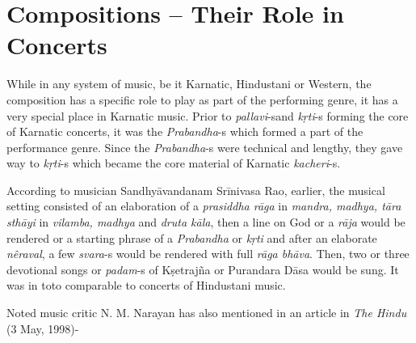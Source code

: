 \vspace{-.3cm}

\section*{Compositions – Their Role in Concerts}

While in any system of music, be it Karnatic, Hindustani or Western, the composition has a specific role to play as part of the performing genre, it has a very special place in Karnatic music. Prior to \textit{pallavi}-s\break and \textit{kṛti}-s forming the core of Karnatic concerts, it was the \textit{Praban\break dha}-s which formed a part of the performance genre. Since the \textit{Prabandha}-s were technical and lengthy, they gave way to \textit{kṛti}-s which became the core material of Karnatic \textit{kacheri}-s.

According to musician Sandhyāvandanam Srīnivasa Rao, earlier, the musical setting consisted of an elaboration of a \textit{prasiddha rāga} in \textit{mandra, madhya, tāra sthāyi} in \textit{vilamba, madhya} and \textit{druta kāla}, then a line on God or a \textit{rāja} would be rendered or a starting phrase of a \textit{Prabandha} or \textit{kṛti} and after an elaborate \textit{nêraval}, a few \textit{svara}-s would be rendered with full \textit{rāga bhāva}. Then, two or three devotional songs or \textit{padam}-s of Kṣetrajña or Purandara Dāsa would be sung. It was in toto comparable to concerts of Hindustani music.

Noted music critic N. M. Narayan has also mentioned in an article in \textit{The Hindu} (3 May, 1998)-


